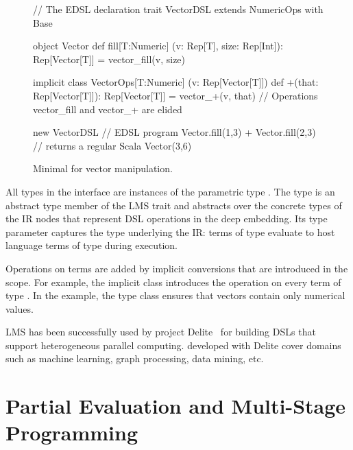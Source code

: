 \begin{figure}
\begin{listingtiny}
// The EDSL declaration
trait VectorDSL extends NumericOps with Base {
  object Vector {
    def fill[T:Numeric]
      (v: Rep[T], size: Rep[Int]): Rep[Vector[T]] =
      vector_fill(v, size)
  }

  implicit class VectorOps[T:Numeric]
    (v: Rep[Vector[T]]) {
    def +(that: Rep[Vector[T]]): Rep[Vector[T]] =
      vector_+(v, that)
  }
  // Operations vector_fill and vector_+ are elided
}

new VectorDSL { // EDSL program
  Vector.fill(1,3) + Vector.fill(2,3)
} // returns a regular Scala Vector(3,6)
\end{listingtiny}
\caption{\label{lst:lms} Minimal \edsl for vector manipulation.}
\end{figure}

All types in the  interface are instances of the
parametric type .  The  type is an abstract
type member of the  LMS trait and abstracts over the
concrete types of the IR nodes that represent DSL operations in the
deep embedding.  Its type parameter captures the type underlying the
IR: \edsl terms of type  evaluate to host language terms
of type  during \edsl execution.

Operations on  terms are added by implicit conversions that are introduced in the \edsl scope. For example, the implicit class  introduces the \code{+} operation on every term of type . In the example, the type class  ensures that vectors contain only numerical values.

LMS has been successfully used by project Delite~\cite{brown_heterogeneous_2011,composition-ecoop2013} for building DSLs that support heterogeneous parallel computing. \edsls developed with Delite cover domains
such as machine learning, graph processing, data mining, etc.

\section{Partial Evaluation and Multi-Stage Programming}
\label{sec:partial-evaluation}
